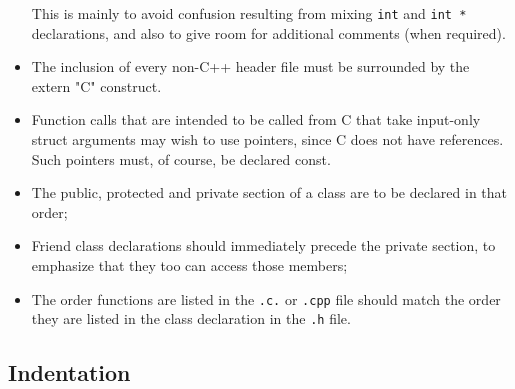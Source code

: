 \documentclass[10pt,letter,relax]{SANDreport}
\begin{document}
\begin{itemize}
\begin{verbatim}
\end{verbatim}
This is mainly to avoid confusion resulting from mixing \verb!int! and
  \verb!int *! declarations, and also to give room for additional comments
  (when required).
\item The inclusion of every non-C++ header file must be surrounded by
  the extern "C" { } construct.
\item Function calls that are intended to be called from C that take input-only struct arguments may wish to use pointers, since C does not have references. Such pointers must, of course, be declared const.
\item The public, protected and private section of a class are to be declared
  in that order;
\item Friend class declarations should immediately precede the private
  section, to emphasize that they too can access those members;
\item The order functions are listed in the \verb!.c.! or \verb!.cpp! file
  should match the order they are listed in the class declaration in the
  \verb!.h! file.
\end{itemize}

\subsection{Indentation}
\end{document}
